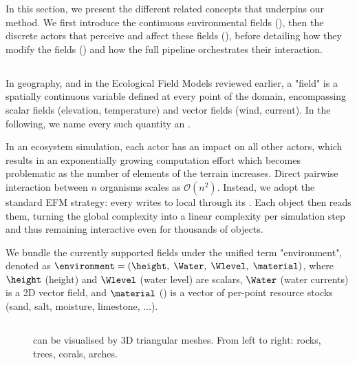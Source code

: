In this section, we present the different related concepts that underpins our method.
We first introduce the continuous environmental fields (), then the discrete actors that perceive and affect these fields (), before detailing how they modify the fields () and how the full pipeline orchestrates their interaction.

\subsection{}
\label{sec:env-obj-communication}

In geography, and in the Ecological Field Models reviewed earlier, a "field" is a spatially continuous variable defined at every point of the domain, encompassing scalar fields (elevation, temperature) and vector fields (wind, current). In the following, we name every such quantity an .

In an ecosystem simulation, each actor has an impact on all other actors, which results in an exponentially growing computation effort which becomes problematic as the number of elements of the terrain increases. Direct pairwise interaction between $n$ organisms scales as $\mathcal{O}(n^{2})$.
Instead, we adopt the standard EFM strategy: every  writes to local  through its .
Each object then reads them, turning the global complexity into a linear complexity per simulation step and thus remaining interactive even for thousands of objects.

We bundle the currently supported fields under the unified term "environment", denoted as $\environment=(\height,\;\Water,\;\Wlevel,\;\material)$,
where $\height$ (height) and $\Wlevel$ (water level) are scalars, $\Water$ (water currents) is a 2D vector field, and $\material$ () is a vector of per-point resource stocks (sand, salt, moisture, limestone, ...).


\subsection{}
\label{sec:env-obj-environmental-objects}

\begin{figure}
    \caption{ can be visualised by 3D triangular meshes. From left to right: rocks, trees, corals, arches.}
    \label{fig:env-obj-assets}
\end{figure}

